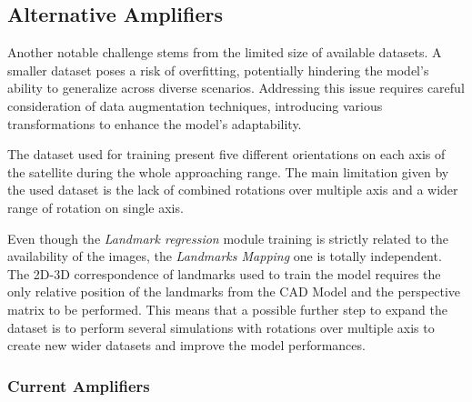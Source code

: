 \subsection{Alternative Amplifiers}
\label{Chapter4/DatasetAv}
Another notable challenge stems from the limited size of available datasets. A smaller dataset poses a risk of overfitting, potentially hindering the model's ability to generalize across diverse scenarios. Addressing this issue requires careful consideration of data augmentation techniques, introducing various transformations to enhance the model's adaptability.

The dataset used for training present five different orientations on each axis of the satellite during the whole approaching range. The main limitation given by the used dataset is the lack of combined rotations over multiple axis and a wider range of rotation on single axis.

Even though the \textit{Landmark regression} module training is strictly related to the availability of the images, the \textit{Landmarks Mapping} one is totally independent. The 2D-3D correspondence of landmarks used to train the model requires the only relative position of the landmarks from the CAD Model and the perspective matrix to be performed. This means that a possible further step to expand the dataset is to perform several simulations with rotations over multiple axis to create new wider datasets and improve the model performances.

\subsubsection{Current Amplifiers}
